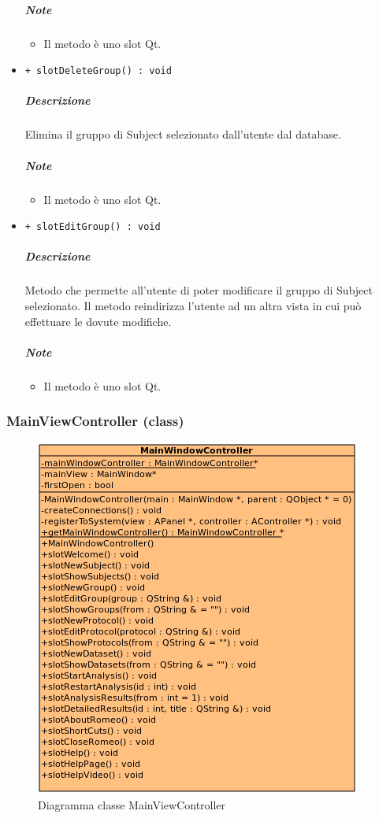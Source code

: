 \begin{itemize}
			\subparagraph{Note}
			\begin{itemize}
				\item Il metodo è uno slot\g{} Qt\g{}.
			\end{itemize}
			\item \color{blue} \verb!+ slotDeleteGroup() : void!
			\color{black}
			\subparagraph{Descrizione} Elimina il gruppo di Subject\g{} selezionato dall'utente dal database.
			\subparagraph{Note}
			\begin{itemize}
				\item Il metodo è uno slot\g{} Qt\g{}.
			\end{itemize}
			\item \color{blue} \verb!+ slotEditGroup() : void!
			\color{black}
			\subparagraph{Descrizione} Metodo che permette all'utente di poter modificare il gruppo di Subject\g{} selezionato. Il metodo reindirizza l'utente ad un altra vista in cui può effettuare le dovute modifiche.
			\subparagraph{Note}
			\begin{itemize}
				\item Il metodo è uno slot\g{} Qt\g{}.
			\end{itemize}
		\end{itemize}
	\subsubsection{MainViewController (class)}
	\begin{figure}[!h]
		\centering
		\includegraphics[scale=2.75]{./Content/Immagini/controller/MainViewController.png}
		\caption{Diagramma classe MainViewController}
	\end{figure}
